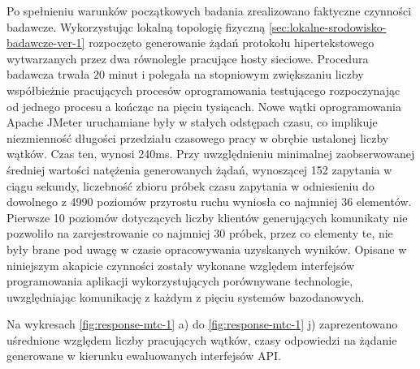 Po spełnieniu warunków początkowych badania zrealizowano faktyczne czynności badawcze. Wykorzystując lokalną topologię fizyczną \ref{sec:lokalne-srodowisko-badawcze-ver-1} rozpoczęto generowanie żądań protokołu hipertekstowego wytwarzanych przez dwa równolegle pracujące hosty sieciowe. Procedura badawcza trwała 20 minut i polegała na stopniowym zwiększaniu liczby współbieżnie pracujących procesów oprogramowania testującego rozpoczynając od jednego procesu a kończąc na pięciu tysiącach. Nowe wątki oprogramowania Apache JMeter uruchamiane były w stałych odstępach czasu, co implikuje niezmienność długości przedziału czasowego pracy w obrębie ustalonej liczby wątków. Czas ten, wynosi 240ms. Przy uwzględnieniu minimalnej zaobserwowanej średniej wartości natężenia generowanych żądań, wynoszącej 152 zapytania w ciągu sekundy, liczebność zbioru próbek czasu zapytania w odniesieniu do dowolnego z 4990 poziomów przyrostu ruchu wyniosła co najmniej 36 elementów. Pierwsze 10 poziomów dotyczących liczby klientów generujących komunikaty nie pozwoliło na zarejestrowanie co najmniej 30 próbek, przez co elementy te, nie były brane pod uwagę w czasie opracowywania uzyskanych wyników. Opisane w niniejszym akapicie czynności zostały wykonane względem interfejsów programowania aplikacji wykorzystujących porównywane technologie, uwzględniając komunikację z każdym z pięciu systemów bazodanowych.

Na wykresach \ref{fig:response-mtc-1} a) do \ref{fig:response-mtc-1} j) zaprezentowano uśrednione względem liczby pracujących wątków, czasy odpowiedzi na żądanie generowane w kierunku ewaluowanych interfejsów API.

